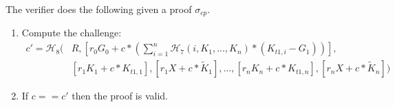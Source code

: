 \begin{appendices}
The verifier does the following given a proof $\sigma_{cp}$.

\begin{enumerate}
    \item Compute the challenge:
    \begin{align*}
        c' = \mathcal{H}_8(&R, [r_0 G_0 + c*(\sum^n_{i=1} \mathcal{H}_7(i, K_1,...,K_n)*(K_{t1,i} - G_1))],\\
        &[r_1 K_1 + c*K_{t1,1}], [r_1 X + c*\tilde{K}_1],...,[r_n K_n + c*K_{t1,n}], [r_n X + c*\tilde{K}_n])
    \end{align*}
    \[\]

    \item If $c == c'$ then the proof is valid.
\end{enumerate}


\end{appendices}